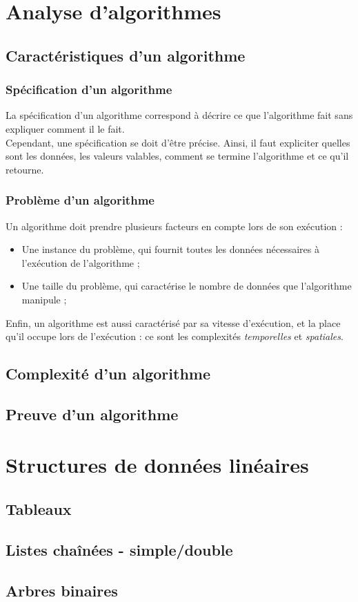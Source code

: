 \documentclass{report}
\begin{document}
\chapter{Analyse d'algorithmes}
\section{Caractéristiques d'un algorithme}
\subsection{Spécification d'un algorithme}
La spécification d'un algorithme correspond à décrire ce que l'algorithme fait sans expliquer comment il le fait.\\
Cependant, une spécification se doit d'être précise.
Ainsi, il faut expliciter quelles sont les données, les valeurs valables, comment se termine l'algorithme et ce qu'il retourne.

\subsection{Problème d'un algorithme}
Un algorithme doit prendre plusieurs facteurs en compte lors de son exécution :
\begin{itemize}
    \item{Une instance du problème, qui fournit toutes les données nécessaires à l'exécution de l'algorithme ;}
    \item{Une taille du problème, qui caractérise le nombre de données que l'algorithme manipule ;}
\end{itemize}
Enfin, un algorithme est aussi caractérisé par sa vitesse d'exécution, et la place qu'il occupe lors de l'exécution : ce sont les complexités \emph{temporelles} et \emph{spatiales}.
\section{Complexité d'un algorithme}

\section{Preuve d'un algorithme}

\chapter{Structures de données linéaires}
\section{Tableaux}
\section{Listes chaînées - simple/double}
\section{Arbres binaires}
\end{document}
